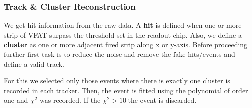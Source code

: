 \subsubsection{Track \& Cluster Reconstruction} %
\label{ssub:track_cluster_reconstruction}
We get hit information from the raw data. A \textbf{hit} is defined when one or more strip of VFAT surpass the threshold set in the readout chip. 
Also, we define a \textbf{cluster} as one or more adjacent fired strip along x or y-axis. Before proceeding further first task is to reduce the noise and remove the fake hits/events and define a valid track.

For this we selected only those events where there is exactly one cluster is recorded in each tracker. Then, the event is fitted using the polynomial of order one and $\chi^2$ was recorded. If the $\chi^2>10$ the event is discarded.


